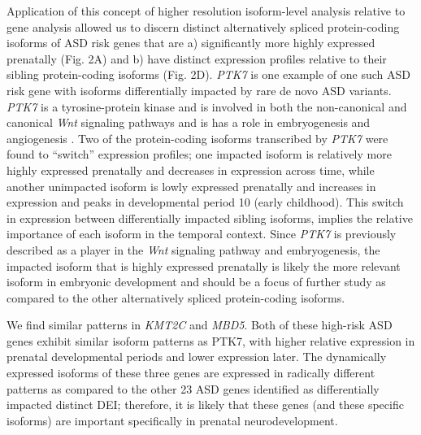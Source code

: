 \documentclass[12pt,chapterheads,final]{ucsd}
\begin{document}
Application of this concept of higher resolution isoform-level analysis relative to gene analysis allowed us to discern distinct alternatively spliced protein-coding isoforms of ASD risk genes that are a) significantly more highly expressed prenatally (Fig. 2A) and b) have distinct expression profiles relative to their sibling protein-coding isoforms (Fig. 2D). \textit{PTK7} is one example of one such ASD risk gene with isoforms differentially impacted by rare de novo ASD variants. \textit{PTK7} is a tyrosine-protein kinase and is involved in both the non-canonical and canonical \textit{Wnt} signaling pathways and is has a role in embryogenesis and angiogenesis \cite{Golubkov2010,Shin2008}. Two of the protein-coding isoforms transcribed by \textit{PTK7} were found to “switch” expression profiles; one impacted isoform is relatively more highly expressed prenatally and decreases in expression across time, while another unimpacted isoform is lowly expressed prenatally and increases in expression and peaks in developmental period 10 (early childhood). This switch in expression between differentially impacted sibling isoforms, implies the relative importance of each isoform in the temporal context. Since \textit{PTK7} is previously described as a player in the \textit{Wnt} signaling pathway and embryogenesis, the impacted isoform that is highly expressed prenatally is likely the more relevant isoform in embryonic development and should be a focus of further study as compared to the other alternatively spliced protein-coding isoforms. \par
We find similar patterns in \textit{KMT2C} and \textit{MBD5}. Both of these high-risk ASD genes exhibit similar isoform patterns as PTK7, with higher relative expression in prenatal developmental periods and lower expression later. The dynamically expressed isoforms of these three genes are expressed in radically different patterns as compared to the other 23 ASD genes identified as differentially impacted distinct DEI; therefore, it is likely that these genes (and these specific isoforms) are important specifically in prenatal neurodevelopment. \par
\end{document}
